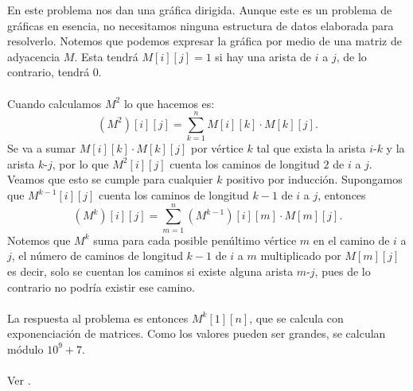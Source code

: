 \begin{center}
\end{center}

En este problema nos dan una gráfica dirigida. Aunque este es un problema de gráficas en esencia, no necesitamos ninguna estructura de datos elaborada para resolverlo. Notemos que podemos expresar la gráfica por medio de una matriz de adyacencia $M$. Esta tendrá $M[i][j]=1$ si hay una arista de $i$ a $j$, de lo contrario, tendrá $0$.
\\\\Cuando calculamos $M^2$ lo que hacemos es:
\[
(M^2)[i][j] = \sum_{k=1}^{n} M[i][k] \cdot M[k][j].
\]
Se va a sumar $M[i][k] \cdot M[k][j]$ por vértice $k$ tal que exista la arista $i$-$k$ y la arista $k$-$j$, por lo que $M^2[i][j]$ cuenta los caminos de longitud $2$ de $i$ a $j$. Veamos que esto se cumple para cualquier $k$ positivo por inducción. Supongamos que $M^{k-1}[i][j]$ cuenta los caminos de longitud $k-1$ de $i$ a $j$, entonces
\[
(M^k)[i][j] = \sum_{m=1}^{n} (M^{k-1})[i][m] \cdot M[m][j].
\]
Notemos que $M^k$ suma para cada posible penúltimo vértice $m$ en el camino de $i$ a $j$, el número de caminos de longitud $k-1$ de $i$ a $m$ multiplicado por $M[m][j]$ es decir, solo se cuentan los caminos si existe alguna arista $m$-$j$, pues de lo contrario no podría existir ese camino.
\\\\La respuesta al problema es entonces $M^k[1][n]$, que se calcula con exponenciación de matrices. Como los valores pueden ser grandes, se calculan módulo $10^9+7$.
\\\\
Ver .
